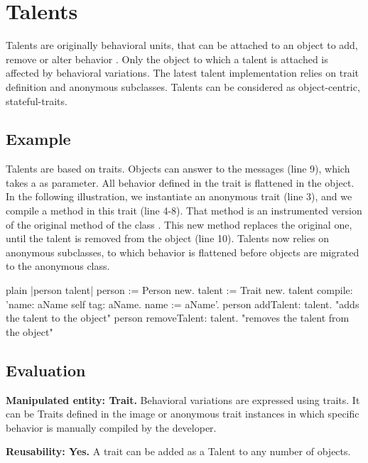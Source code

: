 \documentclass[10pt,twoside,english]{_support/latex/sbabook/sbabook}
\begin{document}
\frontmatter
\pagestyle{plain}

\tableofcontents*
\clearpage\listoffigures

\mainmatter

\chapter{Talents}
Talents are originally behavioral units, that can be attached to an object to add, remove or alter behavior \cite{ressia2014talents}. Only the object to which a talent is attached is affected by behavioral variations. The latest talent implementation relies on trait definition and anonymous subclasses. Talents can be considered as object-centric, stateful-traits.
\section{Example}
Talents are based on traits. Objects can answer to the  messages (line 9), which takes a  as parameter. All behavior defined in the trait is flattened in the object. In the following illustration, we instantiate an anonymous trait (line 3), and we compile a method in this trait (line 4-8). That method is an instrumented version of the original  method of the class . This new method replaces the original one, until the talent is removed from the object (line 10). Talents now relies on anonymous subclasses, to which behavior is flattened before objects are migrated to the anonymous class.

\begin{displaycode}{plain}
|person talent|
  person := Person new.
	talent := Trait new.
	talent
		compile:
			'name: aName
	       self tag: aName.
	       name := aName'.
	person addTalent: talent. "adds the talent to the object"
  person removeTalent: talent. "removes the talent from the object"
\end{displaycode}
\section{Evaluation}
\textbf{Manipulated entity: Trait.} Behavioral variations are expressed using traits. It can be Traits defined in the image or anonymous trait instances in which specific behavior is manually compiled by the developer.

\textbf{Reusability: Yes.} A trait can be added as a Talent to any number of objects.
\end{document}
